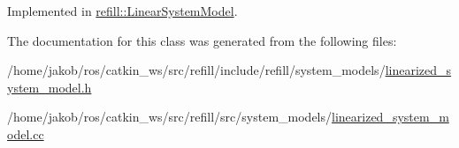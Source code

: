 Implemented in \hyperlink{classrefill_1_1LinearSystemModel_a165b006f5758fd0a24cec545cbfa67b6}{refill\+::\+Linear\+System\+Model}.



The documentation for this class was generated from the following files\+:\begin{DoxyCompactItemize}
\item 
/home/jakob/ros/catkin\+\_\+ws/src/refill/include/refill/system\+\_\+models/\hyperlink{linearized__system__model_8h}{linearized\+\_\+system\+\_\+model.\+h}\item 
/home/jakob/ros/catkin\+\_\+ws/src/refill/src/system\+\_\+models/\hyperlink{linearized__system__model_8cc}{linearized\+\_\+system\+\_\+model.\+cc}\end{DoxyCompactItemize}
